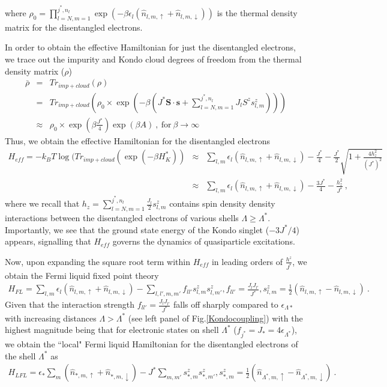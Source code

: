 \documentclass[aps,prb,preprint,groupedaddress]{revtex4-2}
\begin{document}
where $\rho_{0}= \prod_{l=N,m=1}^{j^{*},n_{l}}\exp(-\beta\epsilon_{l}(\hat{n}_{l,m,\uparrow}+\hat{n}_{l,m,\downarrow}))$ is the thermal density matrix for the disentangled electrons.
\par\noindent
In order to obtain the effective Hamiltonian for just the disentangled electrons, we trace out the impurity and Kondo cloud degrees of freedom from the thermal density matrix ($\rho$)
\begin{eqnarray}
\bar{\rho} &=& Tr_{imp+cloud}(\rho)\nonumber\\
&=&Tr_{imp+cloud}(\rho_{0}\times\exp(-\beta(J^{*}\mathbf{S}\cdot\mathbf{s}+\sum_{l=N,m=1}^{j^{*},n_{l}}J_{l}S^{z}s^{z}_{l,m})))\nonumber\\
&\approx &\rho_{0}\times\exp(\beta\frac{J^{*}}{4})\exp(\beta A)~,~ \text{for}~\beta\to \infty
\end{eqnarray}
Thus, we obtain the effective Hamiltonian for the disentangled electrons
\begin{eqnarray}
H_{eff}=-k_{B}T\log(Tr_{imp+cloud}(\exp(-\beta H^{*}_{K})) &\approx &\sum_{l,m}\epsilon_{l}(\hat{n}_{l,m,\uparrow}+\hat{n}_{l,m,\downarrow})-\frac{J^{*}}{4}-\frac{J^{*}}{2}\sqrt{1+\frac{4h_{z}^{2}}{(J^{*})^{2}}}\nonumber\\
&\approx &\sum_{l,m}\epsilon_{l}(\hat{n}_{l,m,\uparrow}+\hat{n}_{l,m,\downarrow})-\frac{3J^{*}}{4}-\frac{h^{2}_{z}}{J^{*}}~,
\end{eqnarray}
where we recall that $ h_{z}=\sum_{l=N,m=1}^{j^{*},n_{l}}\frac{J_{l}}{2}s^{z}_{l,m}$ contains spin density density interactions between the disentangled electrons of various shells $\Lambda\geq \Lambda^{*}$. Importantly, we see that the ground state energy of the Kondo singlet ($-3J^{*}/4$) appears, signalling that $H_{eff}$ governs the dynamics of quasiparticle excitations.
\par\noindent
Now, upon expanding the square root term within $H_{eff}$ in leading orders of $\frac{h^{z}}{J^{*}}$, we obtain the Fermi liquid fixed point theory
\begin{eqnarray}
H_{FL}=\sum_{l,m}\epsilon_{l}(\hat{n}_{l,m,\uparrow}+\hat{n}_{l,m,\downarrow})-\sum_{l,l',m,m'}f_{ll'}s^{z}_{l,m}s^{z}_{l,m'}, f_{ll'}=\frac{J_{l}J_{l'}}{J^{*}}, s^{z}_{l,m}=\frac{1}{2}(\hat{n}_{l,m,\uparrow}-\hat{n}_{l,m,\downarrow})~.
\end{eqnarray}
Given that the interaction strength $f_{ll'}=\frac{J_{l}J_{l'}}{J^{*}}$ falls off sharply compared to $\epsilon_{\Lambda*}$ with increasing distances $\Lambda>\Lambda^{*}$ (see left panel of Fig.\ref{Kondocoupling}) with the highest magnitude being that  for electronic states on shell $\Lambda^{*}$ ($f_{j^{*}}=J_{*}=4\epsilon_{\Lambda^{*}}$), we obtain the ``local" Fermi liquid Hamiltonian for the disentangled electrons of the shell $\Lambda^{*}$ as
\begin{eqnarray}
H_{LFL}=\epsilon_{*}\sum_{m}(\hat{n}_{*,m,\uparrow}+\hat{n}_{*,m,\downarrow})-J^{*}\sum_{m,m'}s^{z}_{*,m}s^{z}_{*,m'}, s^{z}_{*,m}=\frac{1}{2}(\hat{n}_{\Lambda^{*},m,\uparrow}-\hat{n}_{\Lambda^{*},m,\downarrow})~.
\end{eqnarray}
\end{document}
